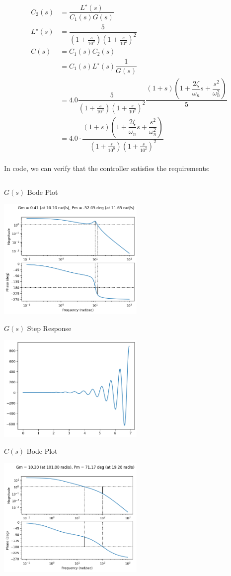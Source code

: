 \documentclass[11pt]{article}
\begin{document}
\begin{align*}
  C_2(s) &= \dfrac{L^\star(s)}{C_1(s) G(s)} \\
  L^\star(s) &= \dfrac{5}{(1 + \frac{s}{10^0})(1 + \frac{s}{10^2})^2} \\
  C(s) &= C_1(s) C_2(s) \\
  &= C_1(s) L^\star(s) \dfrac{1}{G(s)} \\
  &= 4.0 \dfrac{5}{(1 + \frac{s}{10^0})(1 + \frac{s}{10^2})^2} \dfrac{(1 + s) \left(1 + \dfrac{2 \zeta}{\omega_n} s + \dfrac{s^2}{\omega_n^2} \right)}{5} \\
  &= 4.0 \cdot \dfrac{(1 + s) \left(1 + \dfrac{2 \zeta}{\omega_n} s + \dfrac{s^2}{\omega_n^2} \right)}{(1 + \frac{s}{10^0})(1 + \frac{s}{10^2})^2} \\
\end{align*}

In code, we can verify that the controller satisfies the requirements:

\inputminted{python}{a4_1.py}

$G(s)$ Bode Plot

\includegraphics[width=200pt]{a4_2.png}
  
$G(s)$ Step Response

\includegraphics[width=200pt]{a4_3.png}

$C(s)$ Bode Plot

\includegraphics[width=200pt]{a4_4.png}
  
\end{document}
